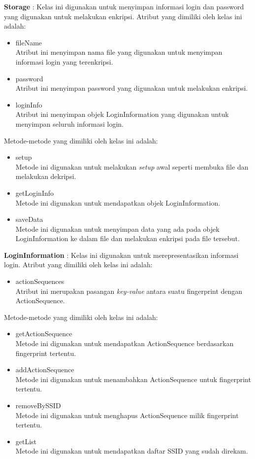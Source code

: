 \par{\textbf{Storage} : Kelas ini digunakan untuk menyimpan informasi login dan password yang digunakan untuk melakukan enkripsi. Atribut yang dimiliki oleh kelas ini adalah:
    \begin{itemize}
        \item{fileName\\Atribut ini menyimpan nama file yang digunakan untuk menyimpan informasi login yang terenkripsi.}
        \item{password\\Atribut ini menyimpan password yang digunakan untuk melakukan enkripsi.}
        \item{loginInfo\\Atribut ini menyimpan objek LoginInformation yang digunakan untuk menyimpan seluruh informasi login.}
    \end{itemize}
    Metode-metode yang dimiliki oleh kelas ini adalah:
    \begin{itemize}
        \item{setup\\Metode ini digunakan untuk melakukan \textit{setup} awal seperti membuka file dan melakukan dekripsi.}
        \item{getLoginInfo\\Metode ini digunakan untuk mendapatkan objek LoginInformation.}
        \item{saveData\\Metode ini digunakan untuk menyimpan data yang ada pada objek LoginInformation ke dalam file dan melakukan enkripsi pada file tersebut.}
    \end{itemize}
}

\par{\textbf{LoginInformation} : Kelas ini digunakan untuk merepresentasikan informasi login. Atribut yang dimiliki oleh kelas ini adalah:
    \begin{itemize}
        \item{actionSequences\\Atribut ini merupakan pasangan \textit{key-value} antara suatu fingerprint dengan ActionSequence.}
    \end{itemize}
    Metode-metode yang dimiliki oleh kelas ini adalah:
    \begin{itemize}
        \item{getActionSequence\\Metode ini digunakan untuk mendapatkan ActionSequence berdasarkan fingerprint tertentu.}
        \item{addActionSequence\\Metode ini digunakan untuk menambahkan ActionSequence untuk fingerprint tertentu.}
        \item{removeBySSID\\Metode ini digunakan untuk menghapus ActionSequence milik fingerprint tertentu.}
        \item{getList\\Metode ini digunakan untuk mendapatkan daftar SSID yang sudah direkam.}
    \end{itemize}
}

